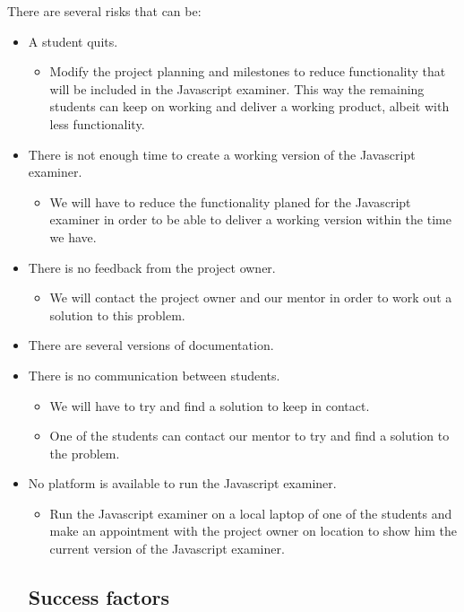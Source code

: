 \documentclass{article}
\begin{document}
There are several risks that can be:
\begin{itemize}
  \item A student quits.
    \begin{itemize}
      \item Modify the project planning and milestones to reduce functionality that will be included in the Javascript examiner. This way the remaining students can keep on working and deliver a working product, albeit with less functionality.
    \end{itemize}
  \item There is not enough time to create a working version of the Javascript examiner.
    \begin{itemize}
      \item We will have to reduce the functionality planed for the Javascript examiner in order to be able to deliver a working version within the time we have.
    \end{itemize}
  \item There is no feedback from the project owner.
    \begin{itemize}
      \item We will contact the project owner and our mentor in order to work out a solution to this problem.
    \end{itemize}
  \item There are several versions of documentation.
  \item There is no communication between students.
    \begin{itemize}
      \item We will have to try and find a solution to keep in contact.
      \item One of the students can contact our mentor to try and find a solution to the problem.
    \end{itemize}
  \item No platform is available to run the Javascript examiner.
    \begin{itemize}
      \item Run the Javascript examiner on a local laptop of one of the students and make an appointment with the project owner on location to show him the current version of the Javascript examiner.
\end{itemize}

\subsection{Success factors}


\end{itemize}
\end{document}
